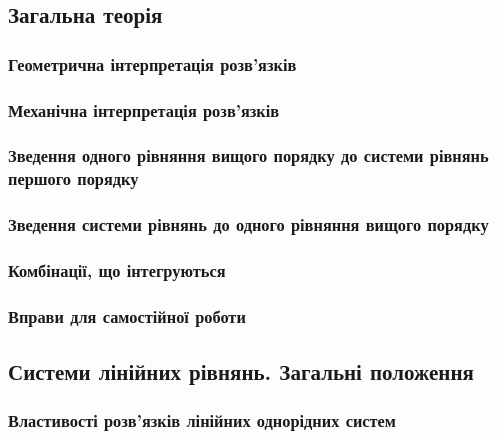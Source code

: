 	\subsection{Загальна теорія}
	

		\subsubsection{Геометрична інтерпретація розв'язків}
		

		\subsubsection{Механічна інтерпретація розв'язків}
		

		\subsubsection{Зведення одного рівняння вищого порядку до системи рівнянь першого порядку}
		

		\subsubsection{Зведення системи рівнянь до одного рівняння вищого порядку}
		

		\subsubsection{Комбінації, що інтегруються}
		

		\subsubsection{Вправи для самостійної роботи}
		

	\subsection{Системи лінійних рівнянь. Загальні положення}
	

		\subsubsection{Властивості розв'язків лінійних однорідних систем}
		

